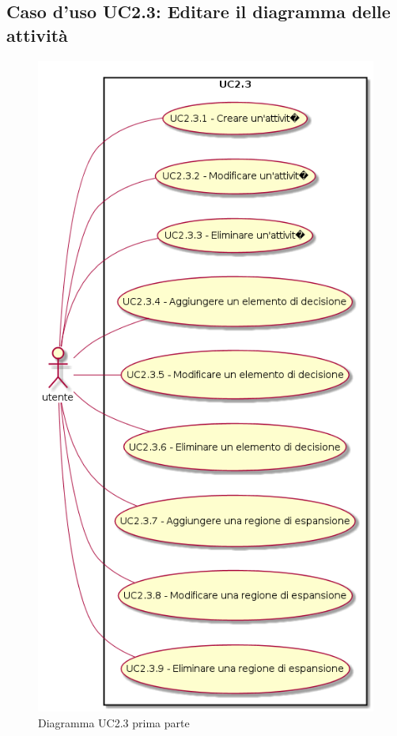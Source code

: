 \documentclass[../AnalisiDeiRequisiti.tex]{subfiles}
\begin{document}
				\subsection{Caso d'uso UC2.3: Editare il diagramma delle attività}
				\begin{figure} [H]
					\centering
					\includegraphics[scale=0.45]{./Figures/UC2-3a.png}
					\caption{Diagramma UC2.3 prima parte}\label{}
				\end{figure}
\end{document}
